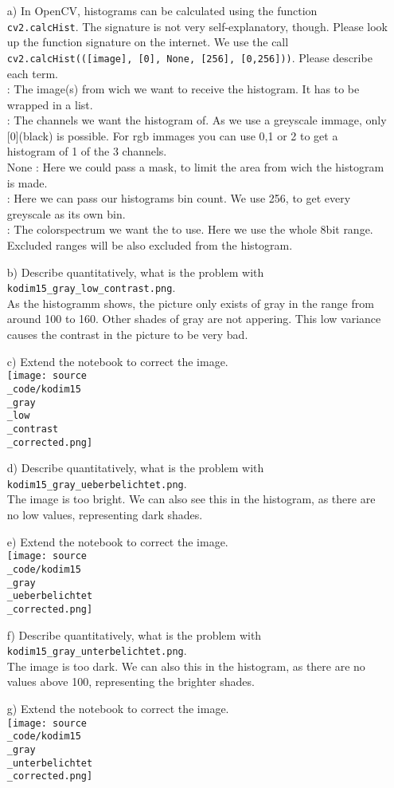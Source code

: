 \begin{enumerate}
\item[a)] In OpenCV, histograms can be calculated using the function \texttt{cv2.calcHist}. The signature is not very self-explanatory, though. Please look up
the function signature on the internet. We use the call \texttt{cv2.calcHist(([image], [0], None, [256], [0,256]))}. Please describe each term.\\
[image] : The image(s) from wich we want to receive the histogram. It has to be wrapped in a list.\\
[0] : The channels we want the histogram of. As we use a greyscale immage, only [0](black) is possible. For rgb immages you can use 0,1 or 2 to get a histogram of 1 of the 3 channels.\\
None : Here we could pass a mask, to limit the area from wich the histogram is made.\\
[256] : Here we can pass our histograms bin count. We use 256, to get every greyscale as its own bin.\\
[0,256] : The colorspectrum we want the to use. Here we use the whole 8bit range. Excluded ranges will be also excluded from the histogram.\\
\item[b)] Describe quantitatively, what is the problem with \texttt{kodim15\_gray\_low\_contrast.png}. \\

As the histogramm shows, the picture only exists of gray in the range from around 100 to 160. Other shades of gray are not appering. This low variance causes the contrast in the picture to be very bad.
\item[c)] Extend the notebook to correct the image. \\
\texttt{[image: source\\\_code/kodim15\\\_gray\\\_low\\\_contrast\\\_corrected.png]}

\item[d)] Describe quantitatively, what is the problem with \texttt{kodim15\_gray\_ueberbelichtet.png}. \\
The image is too bright. We can also see this in the histogram, as there are no low values, representing dark shades.
\item[e)] Extend the notebook to correct the image. \\
\texttt{[image: source\\\_code/kodim15\\\_gray\\\_ueberbelichtet\\\_corrected.png]}

\item[f)] Describe quantitatively, what is the problem with \texttt{kodim15\_gray\_unterbelichtet.png}. \\
The image is too dark. We can also this in the histogram, as there are no values above 100, representing the brighter shades.
\item[g)] Extend the notebook to correct the image. \\
\texttt{[image: source\\\_code/kodim15\\\_gray\\\_unterbelichtet\\\_corrected.png]}
\end{enumerate}

